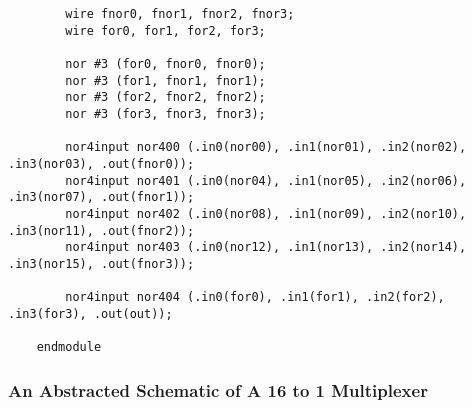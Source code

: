 \documentclass[../main]{subfiles}
\begin{document}
\begin{verbatim}
        wire fnor0, fnor1, fnor2, fnor3;
        wire for0, for1, for2, for3;

        nor #3 (for0, fnor0, fnor0);
        nor #3 (for1, fnor1, fnor1);
        nor #3 (for2, fnor2, fnor2);
        nor #3 (for3, fnor3, fnor3);

        nor4input nor400 (.in0(nor00), .in1(nor01), .in2(nor02), .in3(nor03), .out(fnor0));
        nor4input nor401 (.in0(nor04), .in1(nor05), .in2(nor06), .in3(nor07), .out(fnor1));
        nor4input nor402 (.in0(nor08), .in1(nor09), .in2(nor10), .in3(nor11), .out(fnor2));
        nor4input nor403 (.in0(nor12), .in1(nor13), .in2(nor14), .in3(nor15), .out(fnor3));

        nor4input nor404 (.in0(for0), .in1(for1), .in2(for2), .in3(for3), .out(out));

    endmodule
\end{verbatim}

\clearpage

\subsubsection {An Abstracted Schematic of A 16 to 1 Multiplexer}
\end{document}
